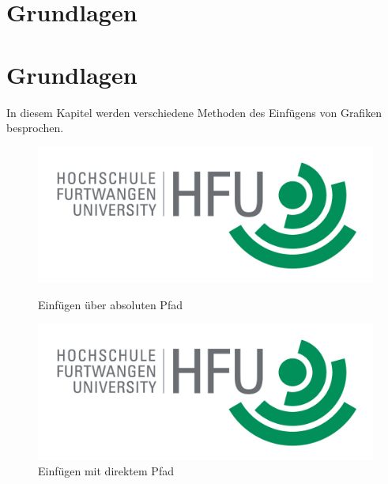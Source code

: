 \chapter{Grundlagen}
\chapter{Grundlagen}

In diesem Kapitel werden verschiedene Methoden des Einfügens von Grafiken besprochen. 
\begin{figure}
    \caption{Einfügen über absoluten Pfad} %
    \includegraphics[width=1\textwidth]{content/pictures/hfu}
    \label{pic:bild3}
\end{figure}

\begin{figure}
    \centering
    \includegraphics[width=13cm]{content/pictures/hfu.jpg}
    \caption{Einfügen mit direktem Pfad} %
    \label{La12bel}
\end{figure}